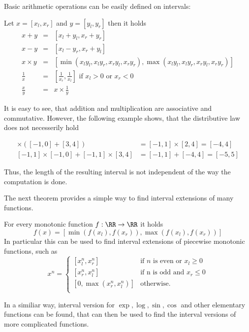  Basic arithmetic operations can be easily defined on intervals:
	\begin{theorem}
		Let $x = [x_l, x_r]$ and $y = [y_l, y_r]$ then it holds
		\begin{eqnarray}
			x + y  & = & [x_l + y_l, x_r + y_r] \\
			x - y  & = & [x_l - y_r, x_r + y_l] \\
			x \times y  & = & [\min(x_ly_l, x_ly_r, x_ry_l, x_ry_r), \max(x_ly_l, x_ly_r, x_ry_l, x_ry_r)] \\
			\frac{1}{x} & = & \left[\frac{1}{x_r}, \frac{1}{x_l} \right] \text{ if } x_l > 0 \text{ or } x_r < 0 \\
			\frac{x}{y} & = & x \times \frac{1}{y}   
		\end{eqnarray}
	\end{theorem}
	It is easy to see, that addition and multiplication are associative and commutative.
	However, the following example shows, that the distributive law does not necesserily hold
	\begin{example}
		\begin{align*}
			[-1,1] \times ([-1,0] + [3,4])  &= [-1,1] \times [2,4] = [-4,4] \\
			[-1,1] \times [-1,0] + [-1,1] \times [3,4] &=  [-1,1] + [-4,4] =[-5,5] 
		\end{align*}
	\end{example} 
	Thus, the length of the resulting interval is not independent of the way the
  computation is done.
	
	The next theorem provides a simple way to find interval extensions of many functions.
	\begin{theorem}
		For every monotonic function $f: \RR \to \RR$ it holds
		$$ f(x) = [\min(f(x_l), f(x_r)), \max(f(x_l), f(x_r))] $$
		In particular this can be used to find interval extensions of piecewise monotonic functions, such as
		\begin{equation}
			x^n  =   
				\begin{cases} 
					[x_l^n, x_r^n] &\mbox{if } n \mbox{ is even or } x_l \geq 0 \\
					[x_r^n, x_l^n] &\mbox{if n is odd and } x_r \leq 0 \\
					[0, \max(x_r^n, x_l^n)] & \mbox{otherwise.}  \\
				\end{cases} 
		\end{equation} 
	\end{theorem}
	In a similiar way, interval version for $\exp, \log, \sin, \cos$ and other elementary functions can be found, 
	that can then be used to find the interval versions of more complicated functions.


